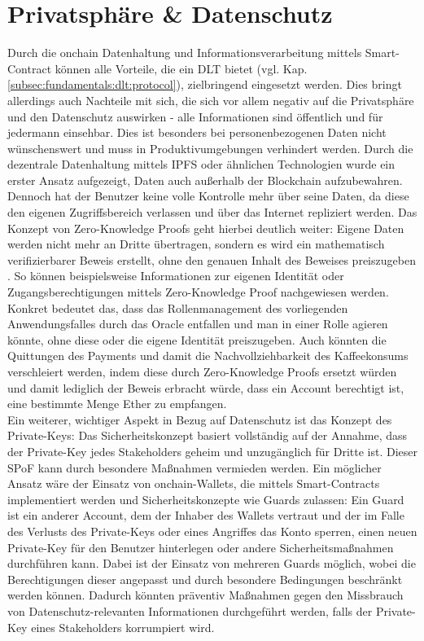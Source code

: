 \section{Privatsphäre \& Datenschutz}
\label{sec:perspective:privacy}
Durch die onchain Datenhaltung und Informationsverarbeitung mittels Smart-Contract können alle Vorteile, die ein \ac{DLT} bietet (vgl. Kap. \ref{subsec:fundamentals:dlt:protocol}), zielbringend eingesetzt werden. Dies bringt allerdings auch Nachteile mit sich, die sich vor allem negativ auf die Privatsphäre und den Datenschutz auswirken - alle Informationen sind öffentlich und für jedermann einsehbar. Dies ist besonders bei personenbezogenen Daten nicht wünschenswert und muss in Produktivumgebungen verhindert werden. Durch die dezentrale Datenhaltung mittels \ac{IPFS} oder ähnlichen Technologien wurde ein erster Ansatz aufgezeigt, Daten auch außerhalb der Blockchain aufzubewahren. Dennoch hat der Benutzer keine volle Kontrolle mehr über seine Daten, da diese den eigenen Zugriffsbereich verlassen und über das Internet repliziert werden. Das Konzept von Zero-Knowledge Proofs geht hierbei deutlich weiter: Eigene Daten werden nicht mehr an Dritte übertragen, sondern es wird ein mathematisch verifizierbarer Beweis erstellt, ohne den genauen Inhalt des Beweises preiszugeben \cite{zeroknowledge2020}. So können beispielsweise Informationen zur eigenen Identität oder Zugangsberechtigungen mittels Zero-Knowledge Proof nachgewiesen werden. Konkret bedeutet das, dass das Rollenmanagement des vorliegenden Anwendungsfalles durch das Oracle entfallen und man in einer Rolle agieren könnte, ohne diese oder die eigene Identität preiszugeben. Auch könnten die Quittungen des Payments und damit die Nachvollziehbarkeit des Kaffeekonsums verschleiert werden, indem diese durch Zero-Knowledge Proofs ersetzt würden und damit lediglich der Beweis erbracht würde, dass ein Account berechtigt ist, eine bestimmte Menge Ether zu empfangen.\\
Ein weiterer, wichtiger Aspekt in Bezug auf Datenschutz ist das Konzept des Private-Keys: Das Sicherheitskonzept basiert vollständig auf der Annahme, dass der Private-Key jedes Stakeholders geheim und unzugänglich für Dritte ist. Dieser \ac{SPoF} kann durch besondere Maßnahmen vermieden werden. Ein möglicher Ansatz wäre der Einsatz von onchain-Wallets, die mittels Smart-Contracts implementiert werden und Sicherheitskonzepte wie Guards zulassen: Ein Guard ist ein anderer Account, dem der Inhaber des Wallets vertraut und der im Falle des Verlusts des Private-Keys oder eines Angriffes das Konto sperren, einen neuen Private-Key für den Benutzer hinterlegen oder andere Sicherheitsmaßnahmen durchführen kann. Dabei ist der Einsatz von mehreren Guards möglich, wobei die Berechtigungen dieser angepasst und durch besondere Bedingungen beschränkt werden können. Dadurch könnten präventiv Maßnahmen gegen den Missbrauch von Datenschutz-relevanten Informationen durchgeführt werden, falls der Private-Key eines Stakeholders korrumpiert wird.

